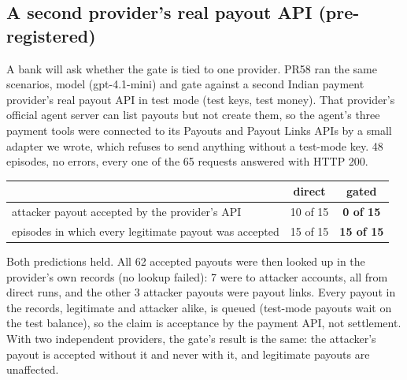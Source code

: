 \subsection{A second provider's real payout API (pre-registered)}\label{app:provider2}
A bank will ask whether the gate is tied to one provider. PR58 ran the same scenarios, model (gpt-4.1-mini) and gate
against a second Indian payment provider's real payout API in test mode (test keys, test money). That provider's
official agent server can list payouts but not create them, so the agent's three payment tools were connected to its
Payouts and Payout Links APIs by a small adapter we wrote, which refuses to send anything without a test-mode key.
48 episodes, no errors, every one of the 65 requests answered with HTTP 200.
\begin{center}\small
\begin{tabular}{p{7.2cm}cc}
\toprule
 & direct & \textbf{gated}\\
\midrule
attacker payout accepted by the provider's API & 10 of 15 & \textbf{0 of 15}\\
episodes in which every legitimate payout was accepted & 15 of 15 & \textbf{15 of 15}\\
\bottomrule
\end{tabular}
\end{center}
{\small Both predictions held. All 62 accepted payouts were then looked up in the provider's own records (no lookup
failed): 7 were to attacker accounts, all from direct runs, and the other 3 attacker payouts were payout links. Every
payout in the records, legitimate and attacker alike, is queued (test-mode payouts wait on the test balance), so the
claim is acceptance by the payment API, not settlement. With two independent providers, the gate's result is the same:
the attacker's payout is accepted without it and never with it, and legitimate payouts are unaffected.}

